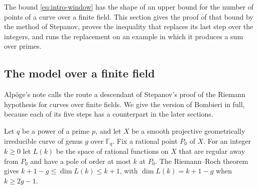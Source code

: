 \documentclass[11pt,letterpaper]{article}
\numberwithin{equation}{section}
\begin{document}
The bound \eqref{eq:intro-window} has the shape of an upper bound for the number of points of a curve over a finite field. This section gives the proof of that bound by the method of Stepanov, proves the inequality that replaces its last step over the integers, and runs the replacement on an example in which it produces a sum over primes.

\subsection{The model over a finite field}\label{sec:ff}

Alp\"oge's note \cite{note} calls the route a descendant of Stepanov's proof \cite{stepanov} of the Riemann hypothesis for curves over finite fields. We give the version of Bombieri \cite{bombieri} in full, because each of its five steps has a counterpart in the later sections.

Let $q$ be a power of a prime $p$, and let $X$ be a smooth projective geometrically irreducible curve of genus $g$ over $\mathbb F_q$. Fix a rational point $P_0$ of $X$. For an integer $k\ge0$ let $L(k)$ be the space of rational functions on $X$ that are regular away from $P_0$ and have a pole of order at most $k$ at $P_0$. The Riemann--Roch theorem gives $k+1-g\le\dim L(k)\le k+1$, with $\dim L(k)=k+1-g$ when $k\ge2g-1$.
\end{document}
